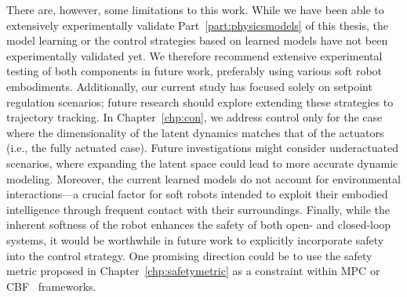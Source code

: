 There are, however, some limitations to this work. 
While we have been able to extensively experimentally validate Part~\ref{part:physicsmodels} of this thesis, the model learning or the control strategies based on learned models have not been experimentally validated yet. We therefore recommend extensive experimental testing of both components in future work, preferably using various soft robot embodiments. Additionally, our current study has focused solely on setpoint regulation scenarios; future research should explore extending these strategies to trajectory tracking. In Chapter~\ref{chp:con}, we address control only for the case where the dimensionality of the latent dynamics matches that of the actuators (i.e., the fully actuated case). Future investigations might consider underactuated scenarios, where expanding the latent space could lead to more accurate dynamic modeling. Moreover, the current learned models do not account for environmental interactions—a crucial factor for soft robots intended to exploit their embodied intelligence through frequent contact with their surroundings. Finally, while the inherent softness of the robot enhances the safety of both open- and closed-loop systems, it would be worthwhile in future work to explicitly incorporate safety into the control strategy. One promising direction could be to use the safety metric proposed in Chapter~\ref{chp:safetymetric} as a constraint within \gls{MPC} or \gls{CBF}~\citep{ames2016control} frameworks.
